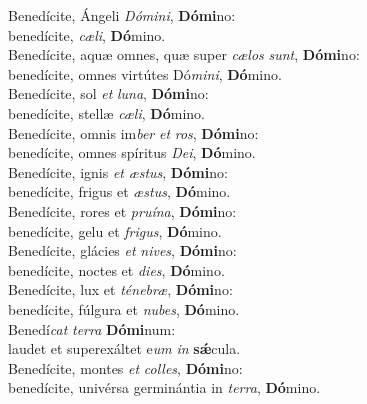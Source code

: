\evenverse Benedícite, Ángeli \textit{Dó}\textit{mi}\textit{ni}, \textbf{Dó}\textbf{mi}no:~\*\\
\evenverse benedícite, \textit{cæ}\textit{li}, \textbf{Dó}mino.\\
\oddverse Benedícite, aquæ omnes, quæ super \textit{cæ}\textit{los} \textit{sunt}, \textbf{Dó}\textbf{mi}no:~\*\\
\oddverse benedícite, omnes virtútes Dó\textit{mi}\textit{ni}, \textbf{Dó}mino.\\
\evenverse Benedícite, sol \textit{et} \textit{lu}\textit{na}, \textbf{Dó}\textbf{mi}no:~\*\\
\evenverse benedícite, stellæ \textit{cæ}\textit{li}, \textbf{Dó}mino.\\
\oddverse Benedícite, omnis im\textit{ber} \textit{et} \textit{ros}, \textbf{Dó}\textbf{mi}no:~\*\\
\oddverse benedícite, omnes spíritus \textit{De}\textit{i}, \textbf{Dó}mino.\\
\evenverse Benedícite, ignis \textit{et} \textit{æ}\textit{stus}, \textbf{Dó}\textbf{mi}no:~\*\\
\evenverse benedícite, frigus et \textit{æ}\textit{stus}, \textbf{Dó}mino.\\
\oddverse Benedícite, rores et \textit{pru}\textit{í}\textit{na}, \textbf{Dó}\textbf{mi}no:~\*\\
\oddverse benedícite, gelu et \textit{fri}\textit{gus}, \textbf{Dó}mino.\\
\evenverse Benedícite, glácies \textit{et} \textit{ni}\textit{ves}, \textbf{Dó}\textbf{mi}no:~\*\\
\evenverse benedícite, noctes et \textit{di}\textit{es}, \textbf{Dó}mino.\\
\oddverse Benedícite, lux et \textit{té}\textit{ne}\textit{bræ}, \textbf{Dó}\textbf{mi}no:~\*\\
\oddverse benedícite, fúlgura et \textit{nu}\textit{bes}, \textbf{Dó}mino.\\
\evenverse Benedí\textit{cat} \textit{ter}\textit{ra} \textbf{Dó}\textbf{mi}num:~\*\\
\evenverse laudet et superexáltet e\textit{um} \textit{in} \textbf{sǽ}cula.\\
\oddverse Benedícite, montes \textit{et} \textit{col}\textit{les}, \textbf{Dó}\textbf{mi}no:~\*\\
\oddverse benedícite, univérsa germinántia in \textit{ter}\textit{ra}, \textbf{Dó}mino.\\
